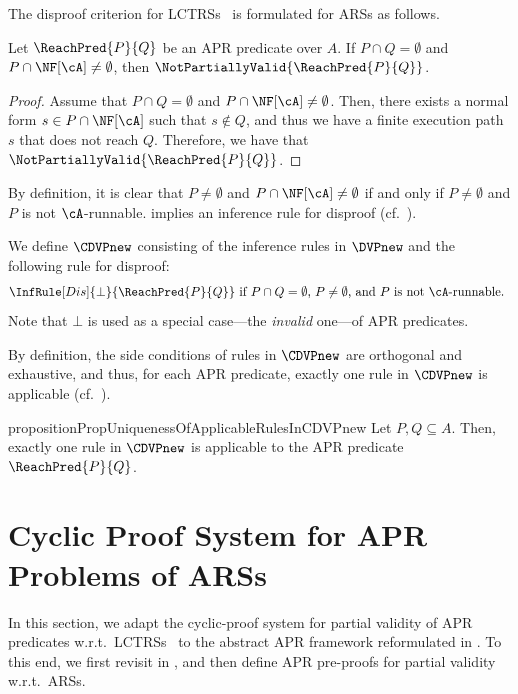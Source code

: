 The disproof criterion for LCTRSs~\cite{KN24jip} is formulated for ARSs as follows.
\begin{proposition}
	\label{prop:disproof-criterion}
	Let $\ReachPred{P}{Q}$ be an APR predicate over $A$.
	If $P \cap Q = \emptyset$
	and
	$P \cap \NF[\cA] \ne \emptyset$,
	then
	$\NotPartiallyValid{\ReachPred{P}{Q}}$.
\end{proposition}
\begin{proof}
	Assume that $P \cap Q = \emptyset$ and $P \cap \NF[\cA] \ne \emptyset$.
	Then, there exists a normal form $s \in P \cap \NF[\cA]$ such that $s \notin Q$, and thus we have a finite execution path $s$ that does not reach $Q$.
	Therefore, we have that $\NotPartiallyValid{\ReachPred{P}{Q}}$.
\end{proof}

By definition, it is clear that $P\ne \emptyset$ and $P \cap \NF[\cA] \ne \emptyset$ if and only if $P \ne \emptyset$ and $P$ is not $\cA$-runnable.
 implies an inference rule for disproof (cf.~\cite{KN24jip}).
\begin{definition}[$\CDVPnew$]
	\label{def:CDVP}
	We define $\CDVPnew$ consisting of the inference rules in $\DVPnew$ and the following rule for disproof:
	\[
		\InfRule[Dis]{\bot
		}{\ReachPred{P}{Q}}
		~\mbox{if
			$P \cap Q = \emptyset$,
			$P \ne \emptyset$,
			and
			$P$ is not $\cA$-runnable.
		}
	\]
	Note that $\bot$ is used as a special case---the \emph{invalid} one---of APR predicates.
\end{definition}
By definition, the side conditions of rules in $\CDVPnew$ are orthogonal and exhaustive, and thus,
for each APR predicate, exactly one rule in $\CDVPnew$ is applicable (cf.~\cite{KN24jip}).
\begin{restatable}{proposition}{PropUniquenessOfApplicableRulesInCDVPnew}
	\label{prop:uniqueness-of-applicable-rules-in-CDVPnew}
	Let $P,Q \subseteq A$.
	Then, exactly one rule in $\CDVPnew$ is applicable to the APR predicate $\ReachPred{P}{Q}$.
\end{restatable}


\section{Cyclic Proof System for APR Problems of ARSs}
\label{sec:cyclic-proof-system-for-ARSs}

In this section, we adapt the cyclic-proof system for partial validity of APR predicates w.r.t.\ LCTRSs~\cite{KN24jip} to the abstract APR framework reformulated in .
To this end, we first revisit  in , and then define APR pre-proofs for partial validity w.r.t.\ ARSs.

